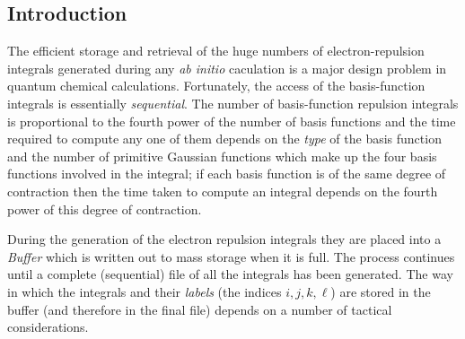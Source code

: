 \subsection{\sf Introduction}
The efficient storage and retrieval of the huge numbers of
electron-repulsion integrals generated during any {\em ab initio}
caculation is a major design problem in quantum chemical calculations.
Fortunately, the access of the basis-function integrals is essentially
{\em sequential}.
The number of basis-function repulsion integrals is proportional
to the fourth power of the number of basis functions and the
time required to compute any one of them depends on the {\em type}
of the basis function and the number of primitive Gaussian functions
which make up the four basis functions involved in the integral;
if each basis function is of the same degree of contraction then the
time taken to compute an integral depends on the fourth power of
this degree of contraction.

During the generation of the electron repulsion integrals they
are placed into a {\em Buffer} which is written out to
mass storage when it is full. The process continues until
a complete (sequential) file of all the integrals has been
generated. The way in which the integrals and their {\em labels}
(the indices $ i , j, k, \ell $) are stored in the buffer (and
therefore in the final file) depends on a number of tactical
considerations.
